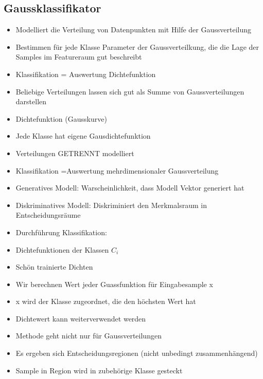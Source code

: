 \documentclass[a4paper,10pt,oneside]{article}
\begin{document}
\subsection{Gaussklassifikator}
\begin{itemize}
	\item Modelliert die Verteilung von Datenpunkten mit Hilfe der Gaussverteilung
	\item Bestimmen für jede Klasse Parameter der Gaussverteilkung, die die Lage der Samples im Featureraum gut beschreibt
	\item Klassifikation = Auswertung Dichtefunktion
	\item Beliebige Verteilungen lassen sich gut als Summe von Gaussverteilungen darstellen
	\item Dichtefunktion (Gausskurve)
	\item Jede Klasse hat eigene Gausdichtefunktion
	\item Verteilungen GETRENNT modelliert
	\item Klassifikation  =Auswertung mehrdimensionaler Gaussverteilung
	\item Generatives Modell: Warscheinlichkeit, dass Modell Vektor generiert hat
	\item Diskriminatives Modell: Diskriminiert den Merkmalsraum in Entscheidungsräume
	\item Durchführung Klassifikation:
	\item Dichtefunktionen der Klassen $C_i $
	\item Schön trainierte Dichten
	\item Wir berechnen Wert jeder Guassfunktion für Eingabesample x
	\item x wird der Klasse zugeordnet, die den höchsten Wert hat
	\item Dichtewert kann weiterverwendet werden
	\item Methode geht nicht nur für Gaussverteilungen
	\item Es ergeben sich Entscheidungsregionen (nicht unbedingt zusammenhängend)
	\item Sample in Region wird in zubehörige Klasse gesteckt
\end{itemize}
\end{document}
